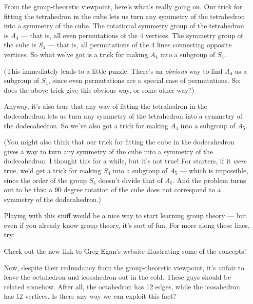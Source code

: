 \documentclass{article}
\def\tightlist{}
\renewcommand{\texttt}[1]{%
  \begingroup
  \ttfamily
  \begingroup\lccode`~=`/\lowercase{\endgroup\def~}{/\discretionary{}{}{}}%
  \begingroup\lccode`~=`[\lowercase{\endgroup\def~}{[\discretionary{}{}{}}%
  \begingroup\lccode`~=`.\lowercase{\endgroup\def~}{.\discretionary{}{}{}}%
  \catcode`/=\active\catcode`[=\active\catcode`.=\active
  \scantokens{#1\noexpand}%
  \endgroup
}
\begin{document}
From the group-theoretic viewpoint, here's what's really going on. Our
trick for fitting the tetrahedron in the cube lets us turn any symmetry
of the tetrahedron into a symmetry of the cube. The rotational symmetry
group of the tetrahedron is \(A_4\) --- that is, all even permutations
of the 4 vertices. The symmetry group of the cube is \(S_4\) --- that
is, all permutations of the 4 lines connecting opposite vertices. So
what we've got is a trick for making \(A_4\) into a subgroup of \(S_4\).

(This immediately leads to a little puzzle. There's an \emph{obvious}
way to find \(A_4\) as a subgroup of \(S_4\), since even permutations
are a special case of permutations. So: does the above trick give this
obvious way, or some other way?)

Anyway, it's also true that any way of fitting the tetrahedron in the
dodecahedron lets us turn any symmetry of the tetrahedron into a
symmetry of the dodecahedron. So we've also got a trick for making
\(A_4\) into a subgroup of \(A_5\).

(You might also think that our trick for fitting the cube in the
dodecahedron gives a way to turn any symmetry of the cube into a
symmetry of the dodecahedron. I thought this for a while, but it's not
true! For starters, if it \emph{were} true, we'd get a trick for making
\(S_4\) into a subgroup of \(A_5\) --- which is impossible, since the
order of the group \(S_4\) doesn't divide that of \(A_5\). And the
problem turns out to be this: a 90 degree rotation of the cube does not
correspond to a symmetry of the dodecahedron.)

Playing with this stuff would be a nice way to start learning group
theory --- but even if you already know group theory, it's sort of fun.
For more along these lines, try:


Check out the new link to Greg Egan's website illustrating some of the
concepts!

Now, despite their redundancy from the group-theoretic viewpoint, it's
unfair to leave the octahedron and icosahedron out in the cold. These
guys should be related somehow. After all, the octahedron has 12 edges,
while the icosahedron has 12 vertices. Is there any way we can exploit
this fact?
\end{document}
